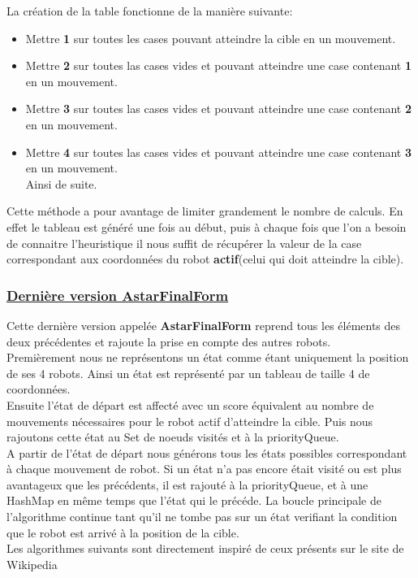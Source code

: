 \documentclass[12pt]{article}
\begin{document}
	La création de la table fonctionne de la manière suivante:
	\begin{itemize}
		\item Mettre \textbf{1} sur toutes les cases pouvant atteindre la cible en un mouvement.
		\item Mettre \textbf{2} sur toutes las cases vides et pouvant atteindre une case contenant \textbf{1} en un mouvement.
		\item Mettre \textbf{3} sur toutes las cases vides et pouvant atteindre une case contenant \textbf{2} en un mouvement.
		\item Mettre \textbf{4} sur toutes las cases vides et pouvant atteindre une case contenant \textbf{3} en un mouvement.\\
		Ainsi de suite.
	\end{itemize}
	Cette méthode a pour avantage de limiter grandement le nombre de calculs. En effet le tableau est généré une fois au début, puis 
	à chaque fois que l'on a besoin de connaitre l'heuristique il nous suffit de récupérer la valeur de la case correspondant aux 
	coordonnées du robot \textbf{actif}(celui qui doit atteindre la cible).

	\subsubsection{\underline{Dernière version AstarFinalForm}} 
	Cette dernière version appelée \textbf{AstarFinalForm} reprend tous les 
	éléments des deux précédentes et rajoute la prise en compte des autres robots.\\
	Premièrement nous ne représentons un état comme étant uniquement la position de ses 4 robots. Ainsi un état est représenté par un
	tableau de taille 4 de coordonnées.\\
	Ensuite l'état de départ est affecté avec un score équivalent au nombre de mouvements nécessaires pour le robot actif d'atteindre la cible.
	Puis nous rajoutons cette état au  Set de noeuds visités et à la priorityQueue.\\
	A partir de l'état de départ nous générons tous les états possibles correspondant à chaque mouvement de robot. Si un état n'a pas encore était visité 
	ou est plus avantageux que les précédents, il est rajouté à la priorityQueue, et à une HashMap en même temps que l'état qui le précéde.
	La boucle principale de l'algorithme continue tant qu'il ne tombe pas sur un état verifiant la condition que le robot est arrivé à la position
	de la cible.\\
	Les algorithmes suivants sont directement inspiré de ceux présents sur le site de Wikipedia \cite{wikiAstarEN}
\end{document}
